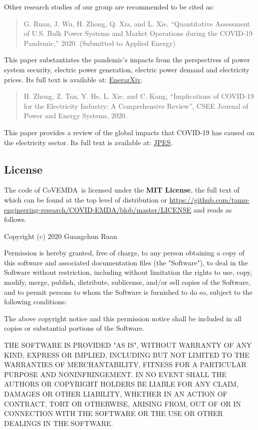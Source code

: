 \documentclass[10pt]{article}
\newcommand{\covemda}{CoVEMDA}
\numberwithin{equation}{section}
\numberwithin{table}{section}
\numberwithin{figure}{section}
\begin{document}
Other research studies of our group are recommended to be cited as:

\begin{quotation}\footnotesize
G. Ruan, J. Wu, H. Zhong, Q. Xia, and L. Xie, ``Quantitative Assessment of U.S. Bulk Power Systems and Market Operations during the COVID-19 Pandemic,'' 2020. (Submitted to Applied Energy)
\end{quotation}

This paper substantiates the pandemic's impacts from the perspectives of power system security, electric power generation, electric power demand and electricity prices. Its full text is available at: \href{http://www.enerarxiv.org/page/thesis.html?id=2196}{EnerarXiv}.

\begin{quotation}\footnotesize
H. Zhong, Z. Tan, Y. He, L. Xie, and C. Kang, ``Implications of COVID-19 for the Electricity Industry: A Comprehensive Review'', CSEE Journal of Power and Energy Systems, 2020.
\end{quotation}

This paper provides a review of the global impacts that COVID-19 has caused on the electricity sector. Its full text is available at: \href{https://ieeexplore.ieee.org/abstract/document/9160443}{JPES}.

\subsection{License}
The code of \covemda~is licensed under the \textbf{MIT License}, the full text of which can be found at the top level of distribution or \url{https://github.com/tamu-engineering-research/COVID-EMDA/blob/master/LICENSE} and reads as follows.
\begin{Notice}
Copyright (c) 2020 Guangchun Ruan

Permission is hereby granted, free of charge, to any person obtaining a copy
of this software and associated documentation files (the "Software"), to deal
in the Software without restriction, including without limitation the rights
to use, copy, modify, merge, publish, distribute, sublicense, and/or sell
copies of the Software, and to permit persons to whom the Software is
furnished to do so, subject to the following conditions:

The above copyright notice and this permission notice shall be included in all
copies or substantial portions of the Software.

THE SOFTWARE IS PROVIDED "AS IS", WITHOUT WARRANTY OF ANY KIND, EXPRESS OR
IMPLIED, INCLUDING BUT NOT LIMITED TO THE WARRANTIES OF MERCHANTABILITY,
FITNESS FOR A PARTICULAR PURPOSE AND NONINFRINGEMENT. IN NO EVENT SHALL THE
AUTHORS OR COPYRIGHT HOLDERS BE LIABLE FOR ANY CLAIM, DAMAGES OR OTHER
LIABILITY, WHETHER IN AN ACTION OF CONTRACT, TORT OR OTHERWISE, ARISING FROM,
OUT OF OR IN CONNECTION WITH THE SOFTWARE OR THE USE OR OTHER DEALINGS IN THE
SOFTWARE.
\end{Notice}
\end{document}

